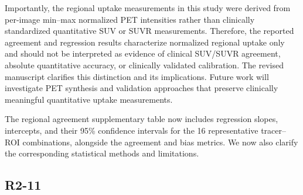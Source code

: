 {Importantly, the regional uptake measurements in this study were derived from per-image min–max normalized PET intensities rather than clinically standardized quantitative SUV or SUVR measurements. Therefore, the reported agreement and regression results characterize normalized regional uptake only and should not be interpreted as evidence of clinical SUV/SUVR agreement, absolute quantitative accuracy, or clinically validated calibration. The revised manuscript clarifies this distinction and its implications. Future work will investigate PET synthesis and validation approaches that preserve clinically meaningful quantitative uptake measurements.

The regional agreement supplementary table now includes regression slopes, intercepts, and their 95\% confidence intervals for the 16 representative tracer–ROI combinations, alongside the agreement and bias metrics. We now also clarify the corresponding statistical methods and limitations.}



\subsection*{R2-11}

